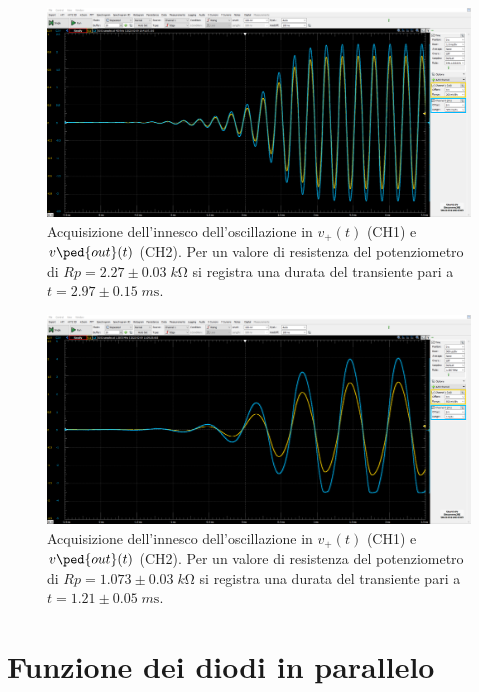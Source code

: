 \documentclass[10pt, a4paper, italian]{article}
\begin{document}
\begin{figure}[htbp]
	\centering
	\includegraphics[width=\textwidth]{start2.2V}
	\caption{Acquisizione dell'innesco dell'oscillazione in $v_+ (t)$ (CH1) e
	$v\ped{out} (t)$ (CH2). Per un valore di resistenza del potenziometro di
	$Rp = 2.27 \pm 0.03 \; \si{k\ohm}$ si registra una durata del transiente
	pari a $t = 2.97 \pm 0.15 \; \si{m\s}$.
	\label{fig: start2.2V}}
\end{figure}

\begin{figure}[htbp]
	\centering
	\includegraphics[width=\textwidth]{start3.96V}
	\caption{Acquisizione dell'innesco dell'oscillazione in $v_+ (t)$ (CH1) e
	$v\ped{out} (t)$ (CH2). Per un valore di resistenza del potenziometro di
	$Rp = 1.073 \pm 0.03 \; \si{k\ohm}$ si registra una durata del transiente
	pari a $t = 1.21 \pm 0.05 \; \si{m\s}$.
	\label{fig: start3.9V}}
\end{figure}

\section{Funzione dei diodi in parallelo}
\end{document}
